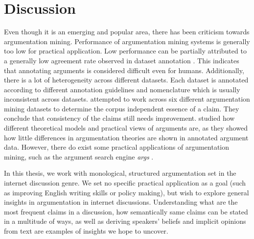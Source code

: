 \section{Discussion}
\label{sec:area_discussion}

Even though it is an emerging and popular area, there has been criticism
towards argumentation mining.  Performance of argumentation mining systems is
generally too low for practical application. Low performance can be partially
attributed to a generally low agreement rate observed in dataset annotation
\citep{peldszus2015joint, boltuzic2017toward}. This indicates that annotating
arguments is considered difficult even for humans. Additionally, there is a lot
of heterogeneity across different datasets. Each dataset is annotated according
to different annotation guidelines and nomenclature which is usually
inconsistent across datasets.  \citet{daxenberger2017essence} attempted to work
across six different argumentation mining datasets to determine the corpus
independent essence of a claim.  They conclude that consistency of the claims
still needs improvement.  \citet{wachsmuth2017argumentation} studied how
different theoretical models and practical views of arguments are, as they
showed how little differences in argumentation theories are shown in annotated
argument data.  However, there do exist some practical applications of
argumentation mining, such as the argument search engine \emph{args}
\citep{wachsmuth2017building}.

In this thesis, we work with monological, structured argumentation set in the
internet discussion genre.  We set no specific practical application as a goal 
(such as improving English writing skills or policy making),
but wish to explore general insights in argumentation in internet discussions. 
Understanding what are the most frequent claims in a discussion, how semantically 
same claims can be stated in a multitude of ways,  
as well as deriving speakers' beliefs and implicit opinions from text 
are examples of insights we hope to uncover. 
